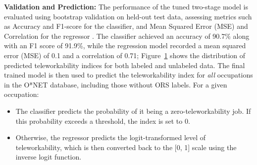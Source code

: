 \documentclass[
  11pt,
  letterpaper,
  DIV=11,
  numbers=noendperiod]{scrartcl}
\providecommand{\tightlist}{%
  \setlength{\itemsep}{0pt}\setlength{\parskip}{0pt}}\usepackage{longtable,booktabs,array}
\theoremstyle{plain}
\theoremstyle{remark}
\begin{document}
\begin{figure}


\caption{\label{fig-dist_labeled_unlabeled}}

\end{figure}%

\textbf{Validation and Prediction:} The performance of the tuned
two-stage model is evaluated using bootstrap validation on held-out test
data, assessing metrics such as Accuracy and F1-score for the
classifier, and Mean Squared Error (MSE) and Correlation for the
regressor . The classifier achieved an accuracy of 90.7\% along with an
F1 score of 91.9\%, while the regression model recorded a mean squared
error (MSE) of 0.1 and a correlation of 0.71;
Figure~\ref{fig-dist_labeled_unlabeled} shows the distribution of
predicted teleworkability indices for both labeled and unlabeled data.
The final trained model is then used to predict the teleworkability
index for \emph{all} occupations in the O*NET database, including those
without ORS labels. For a given occupation:

\begin{itemize}
\tightlist
\item
  The classifier predicts the probability of it being a
  zero-teleworkability job. If this probability exceeds a threshold, the
  index is set to 0.
\item
  Otherwise, the regressor predicts the logit-transformed level of
  teleworkability, which is then converted back to the {[}0, 1{]} scale
  using the inverse logit function.
\end{itemize}
\end{document}
